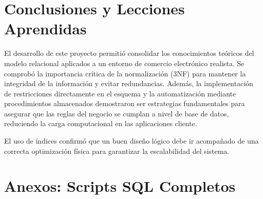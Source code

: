 \documentclass[11pt,a4paper]{article}
\begin{document}
\section{Conclusiones y Lecciones Aprendidas}
El desarrollo de este proyecto permitió consolidar los conocimientos teóricos del modelo relacional aplicados a un entorno de comercio electrónico realista. Se comprobó la importancia crítica de la normalización (3NF) para mantener la integridad de la información y evitar redundancias. Además, la implementación de restricciones directamente en el esquema y la automatización mediante procedimientos almacenados demostraron ser estrategias fundamentales para asegurar que las reglas del negocio se cumplan a nivel de base de datos, reduciendo la carga computacional en las aplicaciones cliente. 

El uso de índices confirmó que un buen diseño lógico debe ir acompañado de una correcta optimización física para garantizar la escalabilidad del sistema.

\newpage
\section{Anexos: Scripts SQL Completos}
\end{document}
